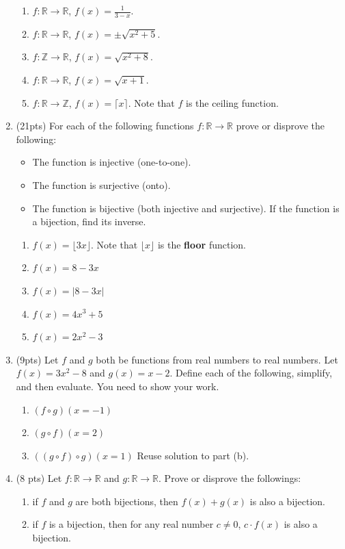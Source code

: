 \documentclass{article}
\begin{document}
\begin{enumerate}
\begin{enumerate}
\item $f:\mathbb{R} \rightarrow \mathbb{R}$, $f(x)=\frac{1}{3-x}$.
\item $f:\mathbb{R} \rightarrow \mathbb{R}$, $f(x)=\pm \sqrt{x^2+5}$.
\item $f:\mathbb{Z} \rightarrow \mathbb{R}$, $f(x)=\sqrt{x^2+8}$.
\item $f:\mathbb{R} \rightarrow \mathbb{R}$, $f(x)=\sqrt{x+1}$.
\item $f:\mathbb{R} \rightarrow \mathbb{Z}$, $f(x)=\lceil x \rceil$. Note that $f$ is the ceiling function.
\end{enumerate}




\item(21pts) For each of the following functions $f:\mathbb{R} \rightarrow \mathbb{R}$ prove or disprove the following:
\begin{itemize}
\item The function is injective (one-to-one).
\item The function is surjective (onto).
\item The function is bijective (both injective and surjective). If the function is a bijection, find its inverse.
\end{itemize}

\begin{enumerate}	
\item $f(x) = \lfloor 3 x \rfloor$. Note that $\lfloor x \rfloor$ is the \textbf{floor} function.
\item $f(x) = 8-3x$
\item $f(x) = |8 - 3 x|$  
\item $f(x) = 4x^3 + 5$
\item $f(x) = 2x^2-3$
\end{enumerate}




\item(9pts) Let $f$ and $g$ both be functions from real numbers to real numbers. Let $f(x) = 3x^2-8$ and $g(x) = x-2$. Define each of the following, simplify, and then evaluate. You need to show your work.
\begin{enumerate}
\item $(f\circ g) (x= -1)$ 
\item $(g\circ f)(x=2)$
\item $((g\circ f)\circ g) (x=1)$ Reuse solution to part (b).
\end{enumerate}




\item (8 pts) Let $f:\mathbb{R} \rightarrow \mathbb{R}$ and $g:\mathbb{R} \rightarrow \mathbb{R}$. Prove or disprove the followings:

\begin{enumerate}
\item if $f$ and $g$ are both bijections, then $f(x)+g(x)$ is also a bijection. 
\item if $f$ is a bijection, then for any real number $c \neq 0$, $c \cdot f(x)$ is also a bijection. 
\end{enumerate}
 
\end{enumerate}
\end{document}
